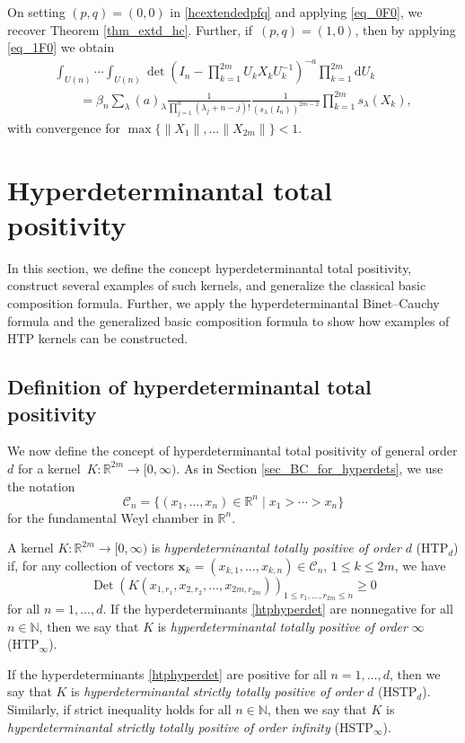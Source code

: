 \documentclass[pdftex]{sigma}
\numberwithin{equation}{section}
\def\N{{\mathbb N}}
\def\R{{\mathbb R}}
\def\dd{ \mathrm{d}}
\def\Det{\operatorname{Det}}
\def\CC{\mathcal{C}}
\def\xx{\boldsymbol{x}}
\begin{document}
On setting $(p,q)=(0,0)$ in \eqref{hcextendedpfq} and applying \eqref{eq_0F0}, we recover Theorem \ref{thm_extd_hc}. Further, if~${(p,q)=(1,0)}$, then by applying \eqref{eq_1F0} we obtain
\begin{gather*}
\int_{U(n)} \cdots \int_{U(n)} \det\left(I_n - \prod_{k=1}^{2m} U_k X_k U_k^{-1}\right)^{-a} \prod_{k=1}^{2m} \dd U_k \\
\qquad= \beta_n \sum_\lambda (a)_\lambda \frac{1}{\prod_{j=1}^n (\lambda_j + n-j)!} \frac{1}{(s_\lambda(I_n))^{2m-2}} \prod_{k=1}^{2m} s_\lambda(X_k),
\end{gather*}
with convergence for $\max\{\|X_1\|,\dots\|X_{2m}\|\} < 1$.

\section{Hyperdeterminantal total positivity}\label{sec_HTP}

In this section, we define the concept hyperdeterminantal total positivity, construct several examples of such kernels, and generalize the classical basic composition formula. Further, we apply the hyperdeterminantal Binet--Cauchy formula and the generalized basic composition formula to show how examples of HTP kernels can be constructed.

\subsection{Definition of hyperdeterminantal total positivity}

We now define the concept of hyperdeterminantal total positivity of general order $d$ for a kernel~${K\colon \R^{2m} \to [0,\infty)}$. As in Section \ref{sec_BC_for_hyperdets}, we use the notation
\[
\CC_n = \{(x_1,\dots,x_n) \in \R^n\mid x_1 > \cdots > x_n\}
\]
for the fundamental Weyl chamber in $\R^n$.

\begin{Definition}
\label{htpdefinition}
A kernel $K\colon \R^{2m} \to [0,\infty)$ is {\it hyperdeterminantal totally positive of order} $d$ (HTP$_d$) if, for any collection of vectors $\xx_k = (x_{k,1},\dots,x_{k,n}) \in \CC_n$, $1 \le k \le 2m$, we have
\begin{equation}
\label{htphyperdet}
\Det(K(x_{1,r_1},x_{2,r_2},\dots,x_{2m,r_{2m}}))_{1 \le r_1,\dots,r_{2m} \le n} \ge 0
\end{equation}
for all $n = 1,\dots,d$. If the hyperdeterminants \eqref{htphyperdet} are nonnegative for all $n \in \N$, then we say that $K$ is {\it hyperdeterminantal totally positive of order} $\infty$ (HTP$_\infty$).

If the hyperdeterminants \eqref{htphyperdet} are positive for all $n = 1,\dots,d$, then we say that $K$ is {\it hyperdeterminantal strictly totally positive of order} $d$ (HSTP$_d$). Similarly, if strict inequality holds for all $n \in \N$, then we say that $K$ is {\it hyperdeterminantal strictly totally positive of order infinity} (HSTP$_\infty$).
\end{Definition}
\end{document}
